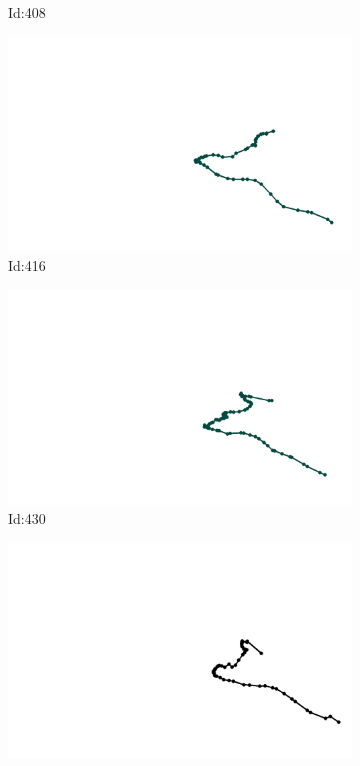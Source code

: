 \documentclass[12pt,twoside]{report}
\begin{document}
\begin{figure}
\begin{subfigure}[b]{0.20\textwidth}
\caption{Id:408}
\end{subfigure}
\begin{subfigure}[b]{0.20\textwidth}
\centering
\includegraphics[width=\textwidth]{../trajectories/416.png}
\caption{Id:416}
\end{subfigure}
\begin{subfigure}[b]{0.20\textwidth}
\centering
\includegraphics[width=\textwidth]{../trajectories/430.png}
\caption{Id:430}
\end{subfigure}
\begin{subfigure}[b]{0.20\textwidth}
\centering
\includegraphics[width=\textwidth]{../trajectories/434.png}

\end{subfigure}
\end{figure}
\end{document}
